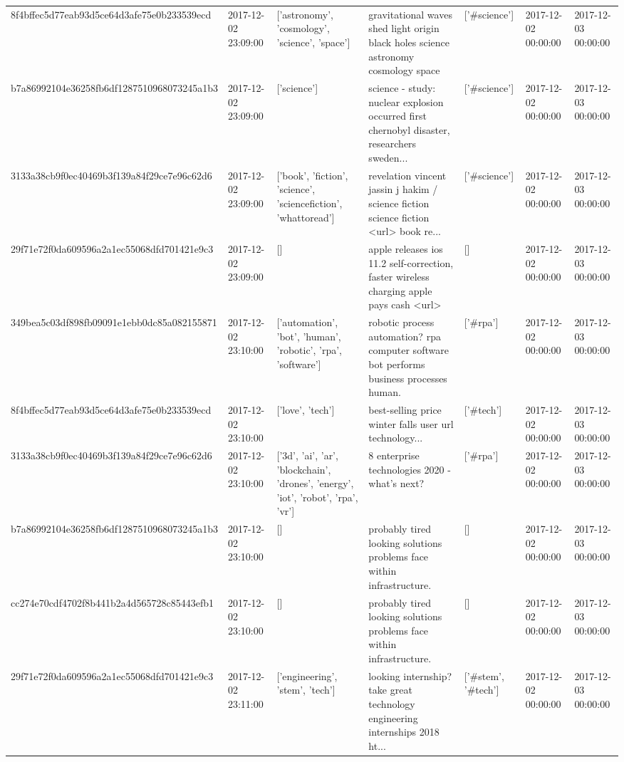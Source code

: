 \begin{tabular}{lllllll}
8f4bffec5d77eab93d5ce64d3afe75e0b233539ecd & 2017-12-02 23:09:00 & ['astronomy', 'cosmology', 'science', 'space'] & gravitational waves shed light origin black holes science astronomy cosmology space & ['#science'] & 2017-12-02 00:00:00 & 2017-12-03 00:00:00 \\
b7a86992104e36258fb6df1287510968073245a1b3 & 2017-12-02 23:09:00 & ['science'] & science - study: nuclear explosion occurred first chernobyl disaster, researchers sweden... & ['#science'] & 2017-12-02 00:00:00 & 2017-12-03 00:00:00 \\
3133a38cb9f0ec40469b3f139a84f29ce7e96c62d6 & 2017-12-02 23:09:00 & ['book', 'fiction', 'science', 'sciencefiction', 'whattoread'] & revelation vincent jassin j hakim / science fiction science fiction <url> book re... & ['#science'] & 2017-12-02 00:00:00 & 2017-12-03 00:00:00 \\
29f71e72f0da609596a2a1ec55068dfd701421e9c3 & 2017-12-02 23:09:00 & [] & apple releases ios 11.2 self-correction, faster wireless charging apple pays cash <url> & [] & 2017-12-02 00:00:00 & 2017-12-03 00:00:00 \\
349bea5c03df898fb09091e1ebb0dc85a082155871 & 2017-12-02 23:10:00 & ['automation', 'bot', 'human', 'robotic', 'rpa', 'software'] & robotic process automation? rpa computer software bot performs business processes human. & ['#rpa'] & 2017-12-02 00:00:00 & 2017-12-03 00:00:00 \\
8f4bffec5d77eab93d5ce64d3afe75e0b233539ecd & 2017-12-02 23:10:00 & ['love', 'tech'] & best-selling price winter falls user url technology... & ['#tech'] & 2017-12-02 00:00:00 & 2017-12-03 00:00:00 \\
3133a38cb9f0ec40469b3f139a84f29ce7e96c62d6 & 2017-12-02 23:10:00 & ['3d', 'ai', 'ar', 'blockchain', 'drones', 'energy', 'iot', 'robot', 'rpa', 'vr'] & 8 enterprise technologies 2020 - what's next? & ['#rpa'] & 2017-12-02 00:00:00 & 2017-12-03 00:00:00 \\
b7a86992104e36258fb6df1287510968073245a1b3 & 2017-12-02 23:10:00 & [] & probably tired looking solutions problems face within infrastructure. & [] & 2017-12-02 00:00:00 & 2017-12-03 00:00:00 \\
cc274e70cdf4702f8b441b2a4d565728c85443efb1 & 2017-12-02 23:10:00 & [] & probably tired looking solutions problems face within infrastructure. & [] & 2017-12-02 00:00:00 & 2017-12-03 00:00:00 \\
29f71e72f0da609596a2a1ec55068dfd701421e9c3 & 2017-12-02 23:11:00 & ['engineering', 'stem', 'tech'] & looking internship? take great technology engineering internships 2018 ht... & ['#stem', '#tech'] & 2017-12-02 00:00:00 & 2017-12-03 00:00:00 \\

\end{tabular}
